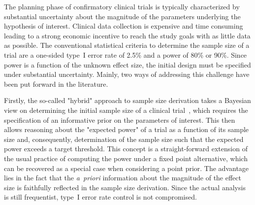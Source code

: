 \documentclass[12pt]{article}
\begin{document}
The planning phase of confirmatory clinical trials is typically
characterized by substantial uncertainty about the magnitude of the
parameters underlying the hypothesis of interest.
Clinical data collection is expensive and time consuming leading to a
strong economic incentive to reach the study goals with as little data as possible.
The conventional statistical criteria to determine the sample size of a trial
are a one-sided type~I error rate of
2.5\% and a power of 80\% or 90\%.
Since power is a function of the unknown effect size, the initial design
must be specified under substantial uncertainty.
Mainly, two ways of addressing this challenge have been put forward in the literature.

Firstly, the so-called "hybrid" approach to sample size
derivation takes a Bayesian
view on determining the initial sample size of a clinical trial~\cite{spiegelhalter1994},
which requires the specification of an informative
prior on the parameters of interest.
This then allows reasoning about the "expected power" of a trial as a
function of its sample size and, consequently, determination of the sample size
such that the expected power exceeds a target threshold.
This concept is a straight-forward extension of the usual practice of
computing the power under a fixed point alternative, which can be recovered as a special case when considering a point prior.
The advantage lies in the fact that the \textit{a~priori} information about the magnitude of the effect size is faithfully
reflected in the sample size derivation.
Since the actual analysis is still frequentist, type~I error rate control is not compromised.
\end{document}

